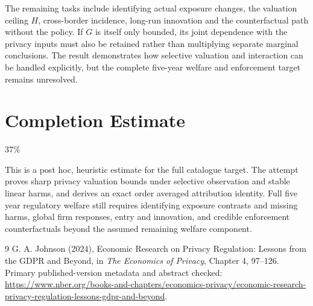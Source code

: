 \documentclass[11pt]{article}
\begin{document}
The remaining tasks include identifying actual exposure changes, the valuation ceiling $H$, cross-border incidence, long-run innovation and the counterfactual path without the policy. If $G$ is itself only bounded, its joint dependence with the privacy inputs must also be retained rather than multiplying separate marginal conclusions. The result demonstrates how selective valuation and interaction can be handled explicitly, but the complete five-year welfare and enforcement target remains unresolved.

\section{Completion Estimate}
37\%

This is a post hoc, heuristic estimate for the full catalogue target.
The attempt proves sharp privacy valuation bounds under selective observation and stable linear harms, and derives an exact order averaged attribution identity. Full five year regulatory welfare still requires identifying exposure contrasts and missing harms, global firm responses, entry and innovation, and credible enforcement counterfactuals beyond the assumed remaining welfare component.

\begin{thebibliography}{9}
 G. A. Johnson (2024), Economic Research on Privacy Regulation: Lessons from the GDPR and Beyond, in \emph{The Economics of Privacy}, Chapter 4, 97--126. Primary published-version metadata and abstract checked:
\url{https://www.nber.org/books-and-chapters/economics-privacy/economic-research-privacy-regulation-lessons-gdpr-and-beyond}.
\end{thebibliography}
\end{document}
